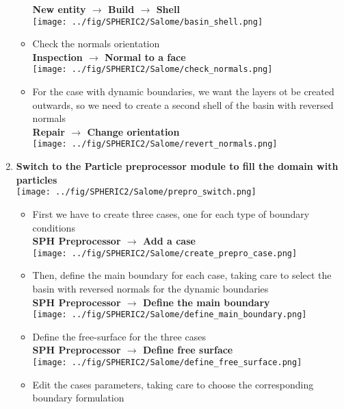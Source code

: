\documentclass{../GPUSPHtemplate}
\begin{document}
\begin{enumerate}
\begin{itemize}
    \textbf{New entity $\to$ Build $\to$ Shell}\smallskip\\
    \texttt{[image: ../fig/SPHERIC2/Salome/basin\_shell.png]}
  \item Check the normals orientation\\
    \textbf{Inspection $\to$ Normal to a face}\smallskip\\
    \texttt{[image: ../fig/SPHERIC2/Salome/check\_normals.png]}
  \item For the case with dynamic boundaries, we want the layers ot be created outwards, so we need to
    create a second shell of the basin with reversed normals\\
    \textbf{Repair $\to$ Change orientation}\smallskip\\
    \texttt{[image: ../fig/SPHERIC2/Salome/revert\_normals.png]}
  \end{itemize}
\item \textbf{Switch to the Particle preprocessor module to fill the domain with particles}\smallskip\\
  \texttt{[image: ../fig/SPHERIC2/Salome/prepro\_switch.png]}
  \begin{itemize}
  \item First we have to create three cases, one for each type of boundary conditions\\
    \textbf{SPH Preprocessor $\to$ Add a case}\smallskip\\
    \texttt{[image: ../fig/SPHERIC2/Salome/create\_prepro\_case.png]}
  \item Then, define the main boundary for each case, taking care to select the basin with reversed normals for the dynamic boundaries\\
    \textbf{SPH Preprocessor $\to$ Define the main boundary}\smallskip\\
    \texttt{[image: ../fig/SPHERIC2/Salome/define\_main\_boundary.png]}
  \item Define the free-surface for the three cases\\
    \textbf{SPH Preprocessor $\to$ Define free surface}\smallskip\\
    \texttt{[image: ../fig/SPHERIC2/Salome/define\_free\_surface.png]}
  \item Edit the cases parameters, taking care to choose the corresponding boundary formulation\\

\end{itemize}
\end{enumerate}
\end{document}
